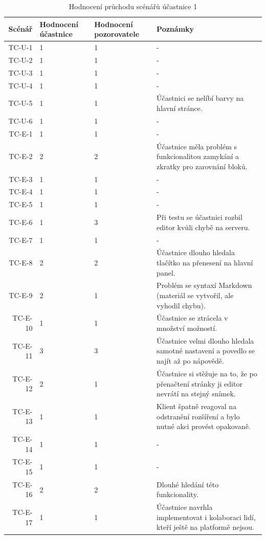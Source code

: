 \begin{longtable}{r|p{2cm}|p{2cm}|p{6cm}}
    \caption{Hodnocení průchodu scénářů účastnice 1}\label{tab:hodnoceniPruchoduUcastnika1}\\
Scénář & Hodnocení účastnice & Hodnocení pozorovatele & Poznámky\\\hline\hline
TC-U-1   & 1 & 1 & - \\\hline
TC-U-2   & 1 & 1 & - \\\hline
TC-U-3   & 1 & 1 & - \\\hline
TC-U-4   & 1 & 1 & -  \\\hline
TC-U-5   & 1 & 1 & Účastnici se nelíbí barvy na hlavní stránce. \\\hline
TC-U-6   & 1 & 1 & - \\\hline
TC-E-1   & 1 & 1 & - \\\hline
TC-E-2   & 2 & 2 & Účastnice měla problém s funkcionalitou zamykání a zkratky pro zarovnání bloků.  \\\hline
TC-E-3   & 1 & 1 & - \\\hline
TC-E-4   & 1 & 1 & - \\\hline
TC-E-5   & 1 & 1 & - \\\hline
TC-E-6   & 1 & 3 & Při testu se účastnici rozbil editor kvůli chybě na serveru.  \\\hline
TC-E-7   & 1 & 1 & - \\\hline
TC-E-8   & 2 & 2 & Účastnice dlouho hledala tlačítko na přenesení na hlavní panel. \\\hline
TC-E-9   & 2 & 1 & Problém se syntaxí Markdown (materiál se vytvořil, ale vyhodil chybu). \\\hline
TC-E-10  & 1 & 1 & Účastnice se ztrácela v množství možností. \\\hline
TC-E-11  & 3 & 3 & Účastnice velmi dlouho hledala samotné nastavení a povedlo se najít až po nápovědě. \\\hline
TC-E-12  & 2 & 1 & Účastnice si stěžuje na to, že po přenačtení stránky ji editor nevrátí na stejný snímek. \\\hline
TC-E-13  & 1 & 1 & Klient špatně reagoval na odstranění rozšíření a bylo nutné akci provést opakovaně. \\\hline
TC-E-14  & 1 & 1 & - \\\hline
TC-E-15  & 1 & 1 & - \\\hline
TC-E-16  & 2 & 2 & Dlouhé hledání této funkcionality. \\\hline
TC-E-17  & 1 & 1 & Účastnice navrhla implementovat i kolaboraci lidí, kteří ještě na platformě nejsou. \\\hline

\end{longtable}
